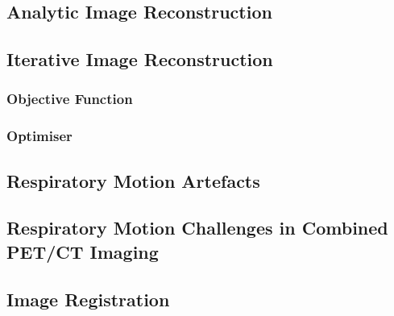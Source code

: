         \blindtext
        
        \subsection{Analytic Image Reconstruction} \label{analytic_image_reconstruction}
            \blindtext
        
        \subsection{Iterative Image Reconstruction} \label{iterative_image_reconstruction}
            \blindtext
            
            \subsubsection{Objective Function} \label{iterative_image_reconstruction_objective_function}
                \blindtext
                
            \subsubsection{Optimiser} \label{iterative_image_reconstruction_optimiser}
                \blindtext
    
        \blindtext
        
        \subsection{Respiratory Motion Artefacts} \label{respiratory_motion_artefacts}
            \blindtext
            
        \subsection{Respiratory Motion Challenges in Combined PET/CT Imaging} \label{respiratory_motion_challenges_in_combined_pet_ct_imaging}
            \blindtext
    
        \blindtext
    
        \subsection{Image Registration} \label{image_registration}
            \blindtext
            
